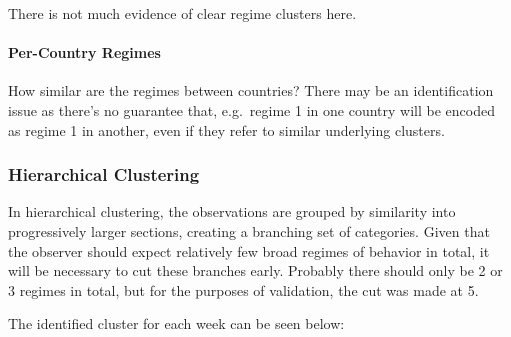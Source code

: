 \documentclass[]{article}
\let\oldparagraph\paragraph
\renewcommand{\paragraph}[1]{\oldparagraph{#1}\mbox{}}
\begin{document}
There is not much evidence of clear regime clusters here.

\paragraph{Per-Country Regimes}\label{per-country-regimes}

How similar are the regimes between countries? There may be an
identification issue as there's no guarantee that, e.g.~regime 1 in one
country will be encoded as regime 1 in another, even if they refer to
similar underlying clusters.

\subsubsection{Hierarchical Clustering}\label{hierarchical-clustering}

In hierarchical clustering, the observations are grouped by similarity
into progressively larger sections, creating a branching set of
categories. Given that the observer should expect relatively few broad
regimes of behavior in total, it will be necessary to cut these branches
early. Probably there should only be 2 or 3 regimes in total, but for
the purposes of validation, the cut was made at 5.

The identified cluster for each week can be seen below:
\end{document}

